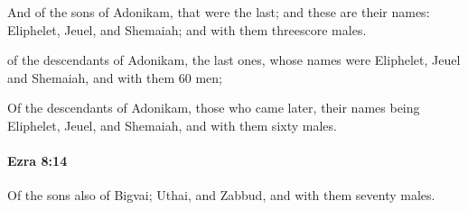 			\begin{versebox}
					\item[BHS] 
					\item[LXX] 
					\item[ASV] And of the sons of Adonikam, that were the last; and these are their names: Eliphelet, Jeuel, and Shemaiah; and with them threescore males.
					\item[NIV] of the descendants of Adonikam, the last ones, whose names were Eliphelet, Jeuel and Shemaiah, and with them 60 men;
					\item[NRSV] Of the descendants of Adonikam, those who came later, their names being Eliphelet, Jeuel, and Shemaiah, and with them sixty males.
			\end{versebox}

		\paragraph{Ezra 8:14} %
			\label{EZRA-8-14}

			Of the sons also of Bigvai; Uthai, and Zabbud, and with them seventy males.

